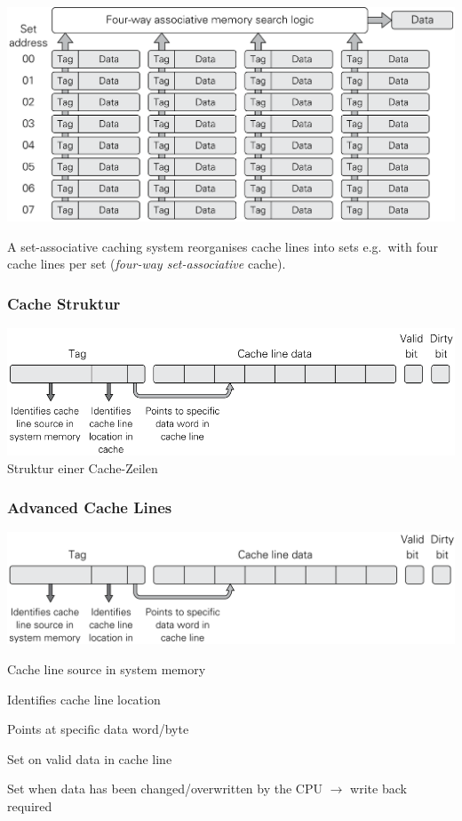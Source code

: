 \documentclass[
  10pt,
  a4paper,
]{article}
\begin{document}
\begin{multicols*}{2}
\includegraphics{images/performance/image-7.png}

A set-associative caching system reorganises cache lines into sets
e.g.~with four cache lines per set (\emph{four-way set-associative}
cache).

\subsubsection{Cache Struktur}\label{cache-struktur}

\includegraphics{images/performance/cache-line-structure.png}
{\footnotesize Struktur einer Cache-Zeilen}

\subsubsection{Advanced Cache Lines}\label{advanced-cache-lines}

\includegraphics{images/performance/image-17.png}

{\footnotesize\begin{description}[style=sameline,parsep=0mm,labelsep=4pt]
\item[\textbf{Cache Tag}] Cache line source in system memory
\item[\textbf{Index}] Identifies cache line location
\item[\textbf{Offset}] Points at specific data word/byte
\item[\textbf{Valid Bit}] Set on valid data in cache line
\item[\textbf{Dirty Bit}] Set when data has been changed/overwritten by the CPU $\rightarrow$ write back required
\end{description}}


\end{multicols*}
\end{document}
